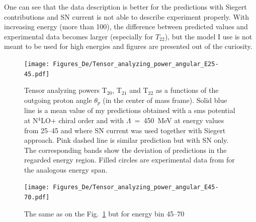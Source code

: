    One can see that the data description is better for the predictions with Siegert contributions 
    and SN current is not able to describe experiment properly. With increasing energy 
    (more than \SI{100}{\mev}),
    the difference between predicted values and experimental data becomes larger
    (especially for $T_{22}$), but the model I use is not meant to be used for high energies 
    and figures are presented out of the curiosity. 
    




    \begin{figure}[h]
        \begin{center}
        \texttt{[image: Figures\_De/Tensor\_analyzing\_power\_angular\_E25-45.pdf]}
        \end{center}
        \caption{Tensor analyzing powers T$_{20}$, T$_{21}$ and T$_{22}$ as a functions of the
        outgoing proton angle $\theta_p$ (in the center of mass frame).
        Solid blue line is a mean value of my predictions obtained with a
        \gls*{sms} potential at N$^4$LO+ chiral order and with $\Lambda$~=~450~MeV
        at energy values from \SIrange[range-phrase=\text{ to }]{25}{45}{\mev} and
        where SN current was used together with Siegert approach. 
        Pink dashed line is similar prediction but with SN only. 
        The corresponding bands show the deviation of predictions in the regarded
        energy region.
        Filled circles are experimental data
        from \cite{rachek2007} for the analogous energy span.}
        \label{tensor_angular_25-45}
    \end{figure}

    \begin{figure}[h]
        \begin{center}
        \texttt{[image: Figures\_De/Tensor\_analyzing\_power\_angular\_E45-70.pdf]}
        \end{center}
        \caption{The same as on the Fig.~\ref*{tensor_angular_25-45} but for energy bin \SIrange{45}{70}{\mev}}
        \label{tensor_angular_45-70}
    \end{figure}

